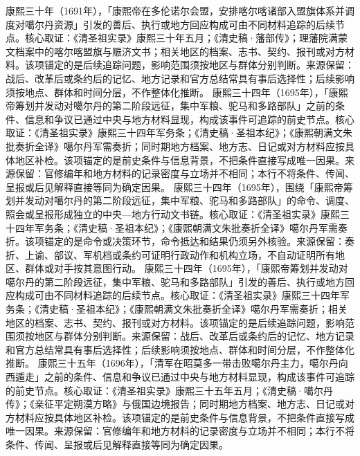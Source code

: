 康熙三十年（1691年），「康熙帝在多伦诺尔会盟，安排喀尔喀诸部入盟旗体系并调度对噶尔丹资源」引发的善后、执行或地方回应构成可由不同材料追踪的后续节点。核心取证：《清圣祖实录》康熙三十年五月；《清史稿·藩部传》；理藩院满蒙文档案中的喀尔喀盟旗与赈济文书；相关地区的档案、志书、契约、报刊或对方材料。该项锚定的是后续追踪问题，影响范围须按地区与群体分别判断。来源保留：战后、改革后或条约后的记忆、地方记录和官方总结常具有事后选择性；后续影响须按地点、群体和时间分层，不作整体化推断。
康熙三十四年（1695年），「康熙帝筹划并发动对噶尔丹的第二阶段远征，集中军粮、驼马和多路部队」之前的条件、信息和争议已通过中央与地方材料显现，构成该事件可追踪的前史节点。核心取证：《清圣祖实录》康熙三十四年军务条；《清史稿·圣祖本纪》；《康熙朝满文朱批奏折全译》噶尔丹军需奏折；同时期地方档案、地方志、日记或对方材料应按具体地区补检。该项锚定的是前史条件与信息背景，不把条件直接写成唯一因果。来源保留：官修编年和地方材料的记录密度与立场并不相同；本行不将条件、传闻、呈报或后见解释直接等同为确定因果。
康熙三十四年（1695年），围绕「康熙帝筹划并发动对噶尔丹的第二阶段远征，集中军粮、驼马和多路部队」的命令、调度、照会或呈报形成独立的中央—地方行动文书链。核心取证：《清圣祖实录》康熙三十四年军务条；《清史稿·圣祖本纪》；《康熙朝满文朱批奏折全译》噶尔丹军需奏折。该项锚定的是命令或决策环节，命令抵达和结果仍须另外核验。来源保留：奏折、上谕、部议、军机档或条约可证明行政动作和机构立场，不自动证明所有地区、群体或对手按其意图行动。
康熙三十四年（1695年），「康熙帝筹划并发动对噶尔丹的第二阶段远征，集中军粮、驼马和多路部队」引发的善后、执行或地方回应构成可由不同材料追踪的后续节点。核心取证：《清圣祖实录》康熙三十四年军务条；《清史稿·圣祖本纪》；《康熙朝满文朱批奏折全译》噶尔丹军需奏折；相关地区的档案、志书、契约、报刊或对方材料。该项锚定的是后续追踪问题，影响范围须按地区与群体分别判断。来源保留：战后、改革后或条约后的记忆、地方记录和官方总结常具有事后选择性；后续影响须按地点、群体和时间分层，不作整体化推断。
康熙三十五年（1696年），「清军在昭莫多一带击败噶尔丹主力，噶尔丹向西遁走」之前的条件、信息和争议已通过中央与地方材料显现，构成该事件可追踪的前史节点。核心取证：《清圣祖实录》康熙三十五年五月；《清史稿·噶尔丹传》；《亲征平定朔漠方略》与俄国边境报告；同时期地方档案、地方志、日记或对方材料应按具体地区补检。该项锚定的是前史条件与信息背景，不把条件直接写成唯一因果。来源保留：官修编年和地方材料的记录密度与立场并不相同；本行不将条件、传闻、呈报或后见解释直接等同为确定因果。
